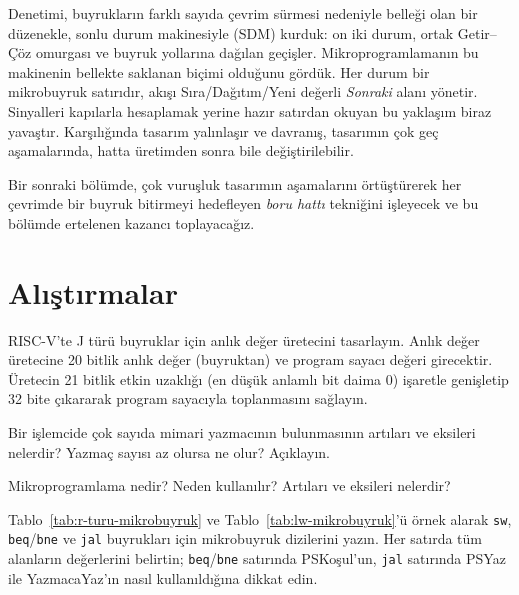 Denetimi, buyrukların farklı sayıda çevrim sürmesi nedeniyle belleği olan bir düzenekle, sonlu durum makinesiyle (SDM) kurduk: on iki durum, ortak Getir--Çöz omurgası ve buyruk yollarına dağılan geçişler. Mikroprogramlamanın bu makinenin bellekte saklanan biçimi olduğunu gördük. Her durum bir mikrobuyruk satırıdır, akışı Sıra/Dağıtım/Yeni değerli \emph{Sonraki} alanı yönetir. Sinyalleri kapılarla hesaplamak yerine hazır satırdan okuyan bu yaklaşım biraz yavaştır. Karşılığında tasarım yalınlaşır ve davranış, tasarımın çok geç aşamalarında, hatta üretimden sonra bile değiştirilebilir.

Bir sonraki bölümde, çok vuruşluk tasarımın aşamalarını örtüştürerek her çevrimde bir buyruk bitirmeyi hedefleyen \emph{boru hattı} tekniğini işleyecek ve bu bölümde ertelenen kazancı toplayacağız.

\section*{Alıştırmalar}

\begin{alistirma}[\zor]
RISC-V'te J türü buyruklar için anlık değer üretecini tasarlayın. Anlık değer üretecine 20 bitlik anlık değer (buyruktan) ve program sayacı değeri girecektir. Üretecin 21 bitlik etkin uzaklığı (en düşük anlamlı bit daima 0) işaretle genişletip 32 bite çıkararak program sayacıyla toplanmasını sağlayın.
\end{alistirma}

\begin{alistirma}[\kolay]
Bir işlemcide çok sayıda mimari yazmacının bulunmasının artıları ve eksileri nelerdir? Yazmaç sayısı az olursa ne olur? Açıklayın.
\end{alistirma}

\begin{alistirma}[\kolay]
Mikroprogramlama nedir? Neden kullanılır? Artıları ve eksileri nelerdir?
\end{alistirma}

\begin{alistirma}[\orta]
Tablo~\ref{tab:r-turu-mikrobuyruk} ve Tablo~\ref{tab:lw-mikrobuyruk}'ü örnek alarak \texttt{sw}, \texttt{beq}/\texttt{bne} ve \texttt{jal} buyrukları için mikrobuyruk dizilerini yazın. Her satırda tüm alanların değerlerini belirtin; \texttt{beq}/\texttt{bne} satırında PSKoşul'un, \texttt{jal} satırında PSYaz ile YazmacaYaz'ın nasıl kullanıldığına dikkat edin.
\end{alistirma}

